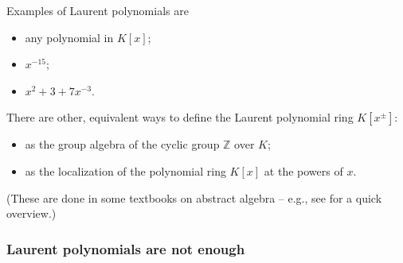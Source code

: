 Examples of Laurent polynomials are

\begin{itemize}
\item any polynomial in $K\left[  x\right]  $;

\item $x^{-15}$;

\item $x^{2}+3+7x^{-3}$.
\end{itemize}

There are other, equivalent ways to define the Laurent polynomial ring
$K\left[  x^{\pm}\right]  $:

\begin{itemize}
\item as the group algebra of the cyclic group $\mathbb{Z}$ over $K$;

\item as the localization of the polynomial ring $K\left[  x\right]  $ at the
powers of $x$.
\end{itemize}

(These are done in some textbooks on abstract algebra -- e.g., see
\cite[Exercise 3.6.32]{Ford21} for a quick overview.)

\subsubsection{Laurent polynomials are not enough}

